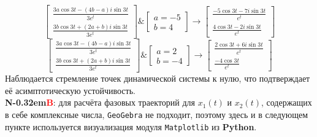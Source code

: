 \documentclass[a3paper,14pt]{extarticle}
\newcommand\NB{\textbf{N\kern-0.32em\textcolor{red}{B}}}
\begin{document}
$$\begin{bmatrix}
    \frac{3a\cos{3t}-(4b-a)i\sin{3t}}{3e^t} \\ \frac{3b\cos{3t}+(2a+b)i\sin{3t}}{3e^t}
\end{bmatrix} \& \begin{bmatrix}
    a=-5 \\b= 4
\end{bmatrix} \rightarrow \begin{bmatrix}
    \frac{-5\cos{3t}-7i\sin{3t}}{e^t} \\ \frac{4\cos{3t}-2i\sin{3t}}{e^t}
\end{bmatrix}$$
$$\begin{bmatrix}
    \frac{3a\cos{3t}-(4b-a)i\sin{3t}}{3e^t} \\ \frac{3b\cos{3t}+(2a+b)i\sin{3t}}{3e^t}
\end{bmatrix} \& \begin{bmatrix}
    a=2 \\ b=-4
\end{bmatrix} \rightarrow \begin{bmatrix}
    \frac{2\cos{3t}+6i\sin{3t}}{e^t} \\ \frac{-4\cos{3t}}{e^t}
\end{bmatrix}$$
Наблюдается стремление точек динамической системы к нулю, что подтверждает её асимптотическую устойчивость. \\[0.5em]
\NB: для расчёта фазовых траекторий для $x_1(t)$ и $x_2(t)$, содержащих в себе комплексные числа, \verb|GeoGebra| не подходит, поэтому здесь и в следующем пункте используется визуализация модуля \verb|Matplotlib| из \textbf{Python}.
\pagebreak
\end{document}
